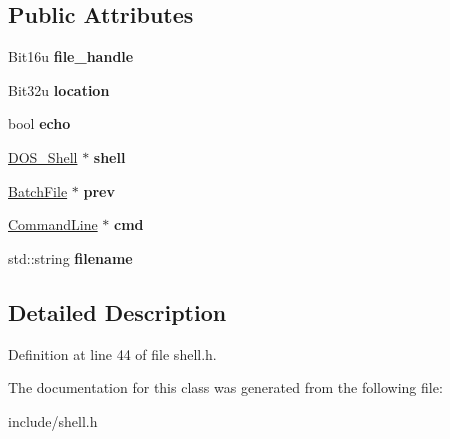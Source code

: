 \subsection*{Public Attributes}
\begin{DoxyCompactItemize}
\item 
\hypertarget{classBatchFile_a0e668547306df551eb7e70baa98241e9}{Bit16u {\bfseries file\-\_\-handle}}\label{classBatchFile_a0e668547306df551eb7e70baa98241e9}

\item 
\hypertarget{classBatchFile_aa9209ce7918ced6ce1a2fc59fff4b0c9}{Bit32u {\bfseries location}}\label{classBatchFile_aa9209ce7918ced6ce1a2fc59fff4b0c9}

\item 
\hypertarget{classBatchFile_ac6faaf367cb17424acd15724a58448ab}{bool {\bfseries echo}}\label{classBatchFile_ac6faaf367cb17424acd15724a58448ab}

\item 
\hypertarget{classBatchFile_a739d699f3d7abf36ae6e85ebe80d80b0}{\hyperlink{classDOS__Shell}{D\-O\-S\-\_\-\-Shell} $\ast$ {\bfseries shell}}\label{classBatchFile_a739d699f3d7abf36ae6e85ebe80d80b0}

\item 
\hypertarget{classBatchFile_a6369bd4d3b07b7661e49aaf43f4ed622}{\hyperlink{classBatchFile}{Batch\-File} $\ast$ {\bfseries prev}}\label{classBatchFile_a6369bd4d3b07b7661e49aaf43f4ed622}

\item 
\hypertarget{classBatchFile_a2b1bcf8ea0fb7f71633708a9886e67ee}{\hyperlink{classCommandLine}{Command\-Line} $\ast$ {\bfseries cmd}}\label{classBatchFile_a2b1bcf8ea0fb7f71633708a9886e67ee}

\item 
\hypertarget{classBatchFile_a2deea964df7496637a1843c66d174189}{std\-::string {\bfseries filename}}\label{classBatchFile_a2deea964df7496637a1843c66d174189}

\end{DoxyCompactItemize}


\subsection{Detailed Description}


Definition at line 44 of file shell.\-h.



The documentation for this class was generated from the following file\-:\begin{DoxyCompactItemize}
\item 
include/shell.\-h\end{DoxyCompactItemize}
